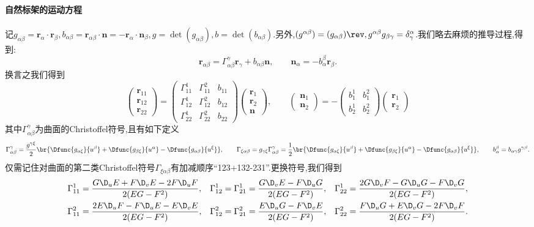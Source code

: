 \documentclass{article}
\begin{document}
\paragraph{自然标架的运动方程}
记$g_{\alpha\beta}=\bm{r}_\alpha\cdot\bm{r}_\beta, b_{\alpha\beta}=\bm{r}_{\alpha\beta}\cdot\bm{n}=-\bm{r}_\alpha\cdot\bm{n}_\beta, g=\det(g_{\alpha\beta}), b=\det(b_{\alpha\beta})$.另外,$(g^{\alpha\beta})=(g_{\alpha\beta})\rev, g^{\alpha\beta}g_{\beta\gamma}=\delta^\alpha_\gamma$.我们略去麻烦的推导过程,得到:
$$\bm{r}_{\alpha\beta}=\Gamma^\gamma_{\alpha\beta}\bm{r}_\gamma+b_{\alpha\beta}\bm{n},\qquad \bm{n}_\alpha=-b^\beta_\alpha\bm{r}_\beta.$$
换言之我们得到$$\begin{pmatrix}
    \bm{r}_{11}\\\bm{r}_{12}\\\bm{r}_{22}
\end{pmatrix}=\begin{pmatrix}
    \Gamma^1_{11}&\Gamma^2_{11}&b_{11}\\\Gamma^1_{12}&\Gamma^2_{12}&b_{12}\\\Gamma^1_{22}&\Gamma^2_{22}&b_{22}
\end{pmatrix}\begin{pmatrix}
    \bm{r}_1\\\bm{r}_2\\\bm{n}
\end{pmatrix},\qquad \begin{pmatrix}
    \bm{n}_1\\\bm{n}_2
\end{pmatrix}=-\begin{pmatrix}
    b_1^1&b_1^2\\b_2^1&b_2^2
\end{pmatrix}\begin{pmatrix}
    \bm{r}_1\\\bm{r}_2
\end{pmatrix}$$
其中$\Gamma_{\alpha\beta}^\gamma$为曲面的Christoffel符号,且有如下定义
$$\Gamma^\gamma_{\alpha\beta}=\frac{g^{\gamma\xi}}{2}\br{\Dfunc{g_{\alpha\xi}}{u^\beta}+\Dfunc{g_{\beta\xi}}{u^\alpha}-\Dfunc{g_{\alpha\beta}}{u^\xi}},\qquad \Gamma_{\xi\alpha\beta}=g_{\gamma\xi}\Gamma^\gamma_{\alpha\beta}=\frac{1}{2}\br{\Dfunc{g_{\alpha\xi}}{u^\beta}+\Dfunc{g_{\beta\xi}}{u^\alpha}-\Dfunc{g_{\alpha\beta}}{u^\xi}},\qquad b^\beta_\alpha=b_{\alpha\gamma}g^{\gamma\beta}.$$
仅需记住对曲面的第二类Christoffel符号$\Gamma_{\xi\alpha\beta}$有加减顺序``123+132-231''.更换符号,我们得到
$$\begin{aligned}
    \Gamma^1_{11}&=\frac{G\D_u E+F\D_vE-2F\D_uF}{2(EG-F^2)},&\Gamma^1_{12}=\Gamma^1_{21}&=\frac{G\D_vE-F\D_uG}{2(EG-F^2)},&\Gamma^1_{22}&=\frac{2G\D_vF-G\D_uG-F\D_vG}{2(EG-F^2)},\\
    \Gamma^2_{11}&=\frac{2E\D_uF-F\D_uE-E\D_vE}{2(EG-F^2)},&\Gamma^2_{12}=\Gamma^2_{21}&=\frac{E\D_uG-F\D_vE}{2(EG-F^2)},&\Gamma^2_{22}&=\frac{F\D_uG+E\D_vG-2F\D_vF}{2(EG-F^2)}.\\
\end{aligned}$$
\end{document}
